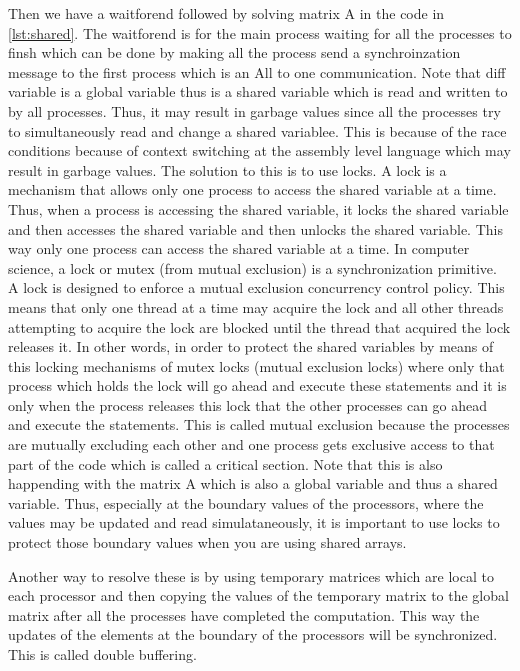 \documentclass[12pt]{article}
\begin{document}
Then we have a waitforend followed by solving matrix A in the code in \ref{lst:shared}.
The waitforend is for the main process waiting for all the processes to finsh which can be done by making all the process 
send a synchroinzation message to the first process which is an All to one communication.
Note that diff variable is a global variable thus is a shared variable which is read and written to by all processes.
Thus, it may result in garbage values since all the processes try to simultaneously read and change a shared variablee. This is because of the race conditions
because of context switching at the assembly level language which may result in garbage values.
The solution to this is to use locks. A lock is a mechanism that allows only one process to access the shared variable at a time. Thus, when a process is accessing the shared variable, it locks the shared variable and then
accesses the shared variable and then unlocks the shared variable. This way only one process can access the shared variable at a time.
In computer science, a lock or mutex (from mutual exclusion) is a synchronization primitive. A lock is designed to enforce a mutual exclusion concurrency control policy. This means that only one thread at a time may acquire the lock and all other threads attempting to acquire the lock are blocked until the thread that acquired the lock releases it.
In other words, in order to protect the shared variables by means of this locking mechanisms of mutex locks (mutual exclusion locks) where only that
process which holds the lock will go ahead and execute these statements and it is only when the process releases this lock 
that the other processes can go ahead and execute the statements. This is called mutual exclusion because the processes are mutually
excluding each other and one process gets exclusive access to that part of the code which is called a critical section.
Note that this is also happending with the matrix A which is also a global variable and thus a shared variable. Thus, especially at the boundary values
of the processors, where the values may be updated and read simulataneously, it is important to
use locks to protect those boundary values when you are using shared arrays.

Another way to resolve these is by using temporary matrices which are local to each processor and then copying the values of the temporary matrix to the global matrix after all the processes have completed the computation.
This way the updates of the elements at the boundary of the processors will be synchronized. This is called double buffering.
\end{document}
